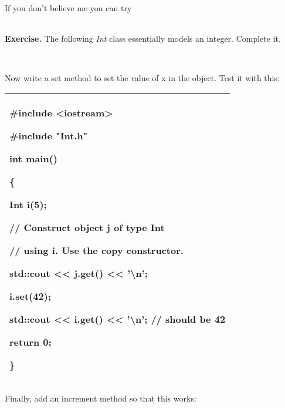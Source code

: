 \documentclass[
]{article}
\begin{document}
\begin{longtable}[]{@{}@{}}
\toprule
\endhead
\bottomrule
\end{longtable}

If you don't believe me you can try

\begin{longtable}[]{@{}@{}}
\toprule
\endhead
\bottomrule
\end{longtable}

\textbf{Exercise.} The following \emph{Int} class essentially models an
integer. Complete it.

\begin{longtable}[]{@{}@{}}
\toprule
\endhead
\bottomrule
\end{longtable}

\begin{longtable}[]{@{}@{}}
\toprule
\endhead
\bottomrule
\end{longtable}

Now write a set method to set the value of x in the object. Test it with
this:

\begin{longtable}[]{@{}l@{}}
\toprule
\endhead
\begin{minipage}[t]{0.97\columnwidth}\raggedright
\#include \textless iostream\textgreater{}

\#include "Int.h"

int main()

\{

Int i(5);

// Construct object j of type Int

// using i. Use the copy constructor.

std::cout \textless\textless{} j.get() \textless\textless{}
'\textbackslash n';

i.set(42);

std::cout \textless\textless{} i.get() \textless\textless{}
'\textbackslash n'; // should be 42

return 0;

\}\strut
\end{minipage}\tabularnewline
\bottomrule
\end{longtable}

Finally, add an increment method so that this works:
\end{document}
